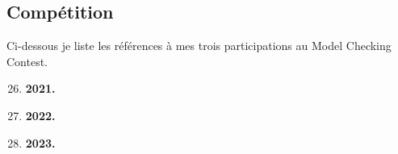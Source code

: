 \subsection*{Compétition}
\vspace{10pt}

Ci-dessous je liste les références à mes trois participations au Model Checking Contest.
\vspace{10pt}
\begin{enumerate}
  \setcounter{enumi}{25}
  \item \textbf{2021.} \smallbreak
  \item \textbf{2022.} \smallbreak
  \item \textbf{2023.} 
\end{enumerate}
